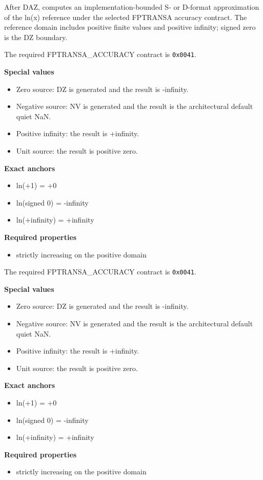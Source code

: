 After DAZ, computes an implementation-bounded S- or D-format approximation of the ln(x) reference under the selected FPTRANSA accuracy contract. The reference domain includes positive finite values and positive infinity; signed zero is the DZ boundary.

The required FPTRANSA\_ACCURACY contract is \texttt{0x0041}.

\textbf{Special values}\par
\begin{itemize}
\item Zero source: DZ is generated and the result is -infinity.
\item Negative source: NV is generated and the result is the architectural default quiet NaN.
\item Positive infinity: the result is +infinity.
\item Unit source: the result is positive zero.
\end{itemize}

\textbf{Exact anchors}\par
\begin{itemize}
\item ln(+1) = +0
\item ln(signed 0) = -infinity
\item ln(+infinity) = +infinity
\end{itemize}

\textbf{Required properties}\par
\begin{itemize}
\item strictly increasing on the positive domain
\end{itemize}

The required FPTRANSA\_ACCURACY contract is \texttt{0x0041}.

\textbf{Special values}\par
\begin{itemize}
\item Zero source: DZ is generated and the result is -infinity.
\item Negative source: NV is generated and the result is the architectural default quiet NaN.
\item Positive infinity: the result is +infinity.
\item Unit source: the result is positive zero.
\end{itemize}

\textbf{Exact anchors}\par
\begin{itemize}
\item ln(+1) = +0
\item ln(signed 0) = -infinity
\item ln(+infinity) = +infinity
\end{itemize}

\textbf{Required properties}\par
\begin{itemize}
\item strictly increasing on the positive domain
\end{itemize}
